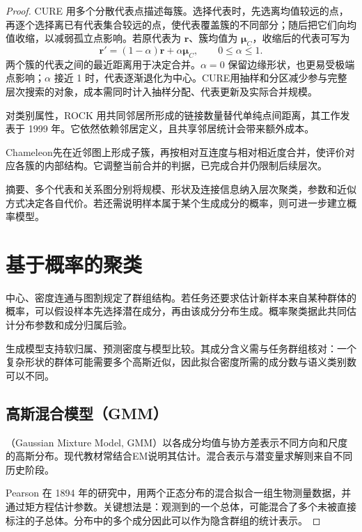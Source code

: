 \begin{proof}
CURE 用多个分散代表点描述每簇。选择代表时，先选离均值较远的点，再逐个选择离已有代表集合较远的点，使代表覆盖簇的不同部分；随后把它们向均值收缩，以减弱孤立点影响。若原代表为 $\bm{r}$、簇均值为 $\bm{\mu}_C$，收缩后的代表可写为
\[
 \bm{r}'=(1-\alpha)\bm{r}+\alpha\bm{\mu}_C,
 \qquad 0\leq\alpha\leq1.
\]
两个簇的代表之间的最近距离用于决定合并。$\alpha=0$ 保留边缘形状，也更易受极端点影响；$\alpha$ 接近 1 时，代表逐渐退化为中心。CURE用抽样和分区减少参与完整层次搜索的对象，成本需同时计入抽样分配、代表更新及实际合并规模。

对类别属性，ROCK 用共同邻居所形成的链接数量替代单纯点间距离，其工作发表于 1999 年。它依然依赖邻居定义，且共享邻居统计会带来额外成本。

\Needspace{55mm}
Chameleon先在近邻图上形成子簇，再按相对互连度与相对相近度合并，使评价对应各簇的内部结构。它调整当前合并的判据，已完成合并仍限制后续层次。

摘要、多个代表和关系图分别将规模、形状及连接信息纳入层次聚类，参数和近似方式决定各自代价。若还需说明样本属于某个生成成分的概率，则可进一步建立概率模型。

\section{基于概率的聚类}
\label{sec:clustering-probabilistic}

中心、密度连通与图割规定了群组结构。若任务还要求估计新样本来自某种群体的概率，可以假设样本先选择潜在成分，再由该成分分布生成。概率聚类据此共同估计分布参数和成分归属后验。

生成模型支持软归属、预测密度与模型比较。其成分含义需与任务群组核对：一个复杂形状的群体可能需要多个高斯近似，因此拟合密度所需的成分数与语义类别数可以不同。

\subsection{高斯混合模型（GMM）}
\label{sec:clustering-gmm}

（Gaussian Mixture Model, GMM）以各成分均值与协方差表示不同方向和尺度的高斯分布。现代教材常结合EM说明其估计。混合表示与潜变量求解则来自不同历史阶段。

Pearson 在 1894 年的研究中，用两个正态分布的混合拟合一组生物测量数据，并通过矩方程估计参数。关键想法是：观测到的一个总体，可能混合了多个未被直接标注的子总体。分布中的多个成分因此可以作为隐含群组的统计表示。


\end{proof}

